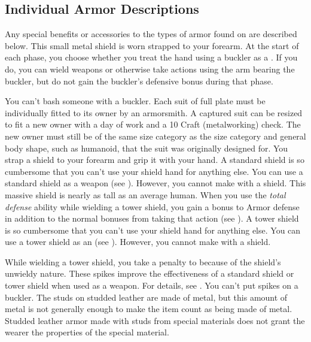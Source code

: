   \subsection{Individual Armor Descriptions}
    Any special benefits or accessories to the types of armor found on  are described below.
     This small metal shield is worn strapped to your forearm.
    At the start of each phase, you choose whether you treat the hand using a buckler as a .
    If you do, you can wield weapons or otherwise take actions using the arm bearing the buckler, but do not gain the buckler's defensive bonus during that phase.
    \par You can't bash someone with a buckler.
     Each suit of full plate must be individually fitted to its owner by an armorsmith.
    A captured suit can be resized to fit a new owner with a day of work and a  10 Craft (metalworking) check.
    The new owner must still be of the same size category as the size category and general body shape, such as humanoid, that the suit was originally designed for.
     You strap a shield to your forearm and grip it with your hand.
    A standard shield is so cumbersome that you can't use your shield hand for anything else.
    You can use a standard shield as a weapon (see ).
    However, you cannot make  with a shield.
     This massive shield is nearly as tall as an average human.
    When you use the \textit{total defense} ability while wielding a tower shield, you gain a  bonus to Armor defense in addition to the normal bonuses from taking that action (see ).
    A tower shield is so cumbersome that you can't use your shield hand for anything else.
    You can use a tower shield as an  (see ).
    However, you cannot make  with a shield.

    While wielding a tower shield, you take a  penalty to  because of the shield's unwieldy nature.
     These spikes improve the effectiveness of a standard shield or tower shield when used as a weapon.
    For details, see .
    You can't put spikes on a buckler.
     The studs on studded leather are made of metal, but this amount of metal is not generally enough to make the item count as being made of metal.
    Studded leather armor made with studs from special materials does not grant the wearer the properties of the special material.

